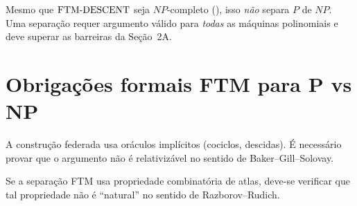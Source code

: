 \documentclass[11pt,a4paper]{article}
\begin{document}
\begin{remark}
Mesmo que $\mathrm{FTM\text{-}DESCENT}$ seja $NP$-completo (\OPEN),
isso \emph{não} separa $P$ de $NP$.
Uma separação requer argumento válido para \emph{todas} as máquinas
polinomiais e deve superar as barreiras da Seção~2A.
\end{remark}

\section{Obrigações formais FTM para P vs NP}

\begin{gap}
A construção federada usa oráculos implícitos (cociclos, descidas).
É necessário provar que o argumento não é relativizável no sentido
de Baker–Gill–Solovay. \OPEN
\end{gap}

\begin{gap}
Se a separação FTM usa propriedade combinatória de atlas,
deve-se verificar que tal propriedade não é ``natural''
no sentido de Razborov–Rudich. \OPEN
\end{gap}

\end{document}

